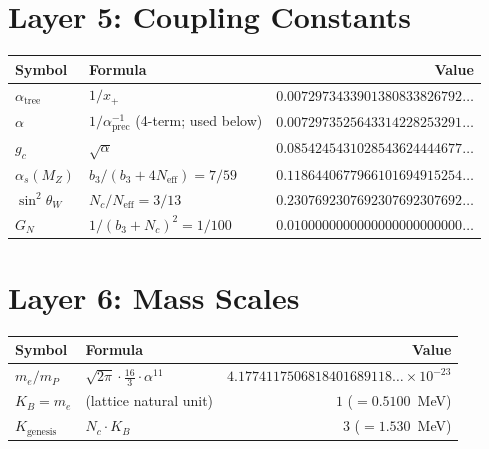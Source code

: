 \documentclass[11pt,a4paper]{article}
\begin{document}
\section*{Layer 5: Coupling Constants}

\begin{longtable}{lp{5.5cm}r}
\toprule
\textbf{Symbol} & \textbf{Formula} & \textbf{Value} \\
\midrule
\endhead
$\alpha_{\mathrm{tree}}$ & $1/x_+$ &
$0.0072973433901380833826792\ldots$ \\[4pt]
$\alpha$ & $1/\alpha^{-1}_{\mathrm{prec}}$ \quad (4-term; used below) &
$0.0072973525643314228253291\ldots$ \\[4pt]
$g_c$ & $\sqrt{\alpha}$ &
$0.0854245431028543624444677\ldots$ \\[4pt]
$\alpha_s(M_Z)$ & $b_3/(b_3 + 4N_{\mathrm{eff}}) = 7/59$ &
$0.1186440677966101694915254\ldots$ \\[4pt]
$\sin^2\!\theta_W$ & $N_c/N_{\mathrm{eff}} = 3/13$ &
$0.2307692307692307692307692\ldots$ \\[4pt]
$G_N$ & $1/(b_3 + N_c)^2 = 1/100$ &
$0.0100000000000000000000000\ldots$ \\
\bottomrule
\end{longtable}

\section*{Layer 6: Mass Scales}

\begin{longtable}{lp{5.5cm}r}
\toprule
\textbf{Symbol} & \textbf{Formula} & \textbf{Value} \\
\midrule
\endhead
$m_e/m_P$ & $\sqrt{2\pi}\cdot\frac{16}{3}\cdot\alpha^{11}$ &
$4.1774117506818401689118\ldots\times 10^{-23}$ \\[6pt]
$K_B = m_e$ & (lattice natural unit) & $1$ \quad ($= 0.5100$~MeV) \\[4pt]
$K_{\mathrm{genesis}}$ & $N_c \cdot K_B$ & $3$ \quad ($= 1.530$~MeV) \\
\bottomrule
\end{longtable}

\end{document}
